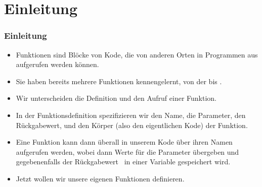 \documentclass[aspectratio=169,mathserif,notheorems]{beamer}%
\subtitle{26.~Funktionen definieren und aufrufen}%
\begin{document}
%
%
\startPresentation%
%
\section{Einleitung}%
\begin{frame}%
\frametitle{Einleitung}%
\begin{itemize}%
%
\item Funktionen sind Blöcke von Kode, die von anderen Orten in Programmen aus aufgerufen werden können.%
%
\item<2-> Sie haben bereits mehrere Funktionen kennengelernt, von der  bis .%
%
\item<3-> Wir unterscheiden die Definition und den Aufruf einer Funktion.%
%
\item<4-> In der Funktionsdefinition spezifizieren wir den Name, die Parameter, den Rückgabewert, und den Körper (also den eigentlichen Kode) der Funktion.%
%
\item<5-> Eine Funktion kann dann überall in unserem Kode über ihren Namen aufgerufen werden, wobei dann Werte für die Parameter übergeben und gegebenenfalls der Rückgabewert \DEzB\ in einer Variable gespeichert wird.%
%
\item<6-> Jetzt wollen wir unsere eigenen Funktionen definieren\cite{PSF:P3D:TPT:MCFT}.%
%
%
\end{itemize}%
\end{frame}%
%
\end{document}
